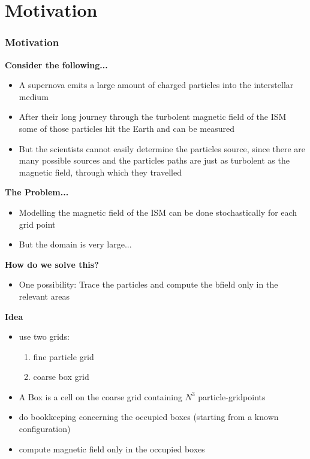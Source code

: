\section{Motivation}
\begin{frame}
    \frametitle{Motivation}
    \textbf{Consider the following...}
    \begin{itemize}
        \item A supernova emits a large amount of charged particles into the
            interstellar medium
        \item After their long journey through the turbolent magnetic field of
            the ISM some of those particles hit the Earth and can be measured
        \item But the scientists cannot easily determine the particles source,
            since there are many possible sources and the particles paths are
            just as turbolent as the magnetic field, through which they
            travelled
    \end{itemize}

    \textbf{The Problem...}
    \begin{itemize}
        \item Modelling the magnetic field of the ISM can be done
            stochastically for each grid point
        \item But the domain is very large...
    \end{itemize}
\end{frame}

\begin{frame}
    \textbf{How do we solve this?}
    \begin{itemize}
        \item One possibility: Trace the particles and compute the bfield only
            in the relevant areas
    \end{itemize}

    \textbf{Idea}
    \begin{itemize}
        \item use two grids:
        \begin{enumerate}
            \item fine particle grid
            \item coarse box grid
        \end{enumerate}
        \item A Box is a cell on the coarse grid containing $N^3$
            particle-gridpoints
        \item do bookkeeping concerning the occupied boxes (starting from a
            known configuration)
        \item compute magnetic field only in the occupied boxes
    \end{itemize}
\end{frame}


